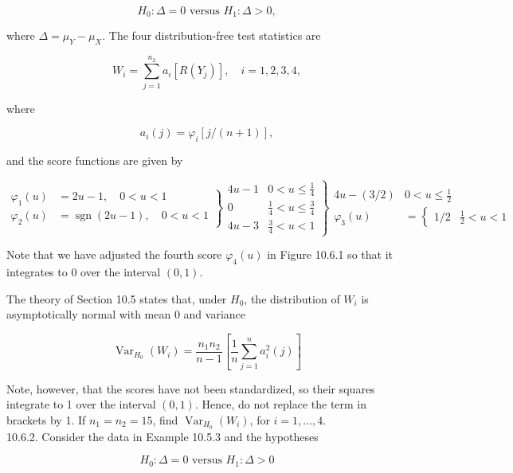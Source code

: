 $$
H_{0}: \Delta=0 \text { versus } H_{1}: \Delta>0,
$$

where $\Delta=\mu_{Y}-\mu_{X}$. The four distribution-free test statistics are


\begin{equation*}
W_{i}=\sum_{j=1}^{n_{2}} a_{i}\left[R\left(Y_{j}\right)\right], \quad i=1,2,3,4, \tag{10.6.4}
\end{equation*}


where

$$
a_{i}(j)=\varphi_{i}[j /(n+1)],
$$

and the score functions are given by

$$
\left.\left.\begin{array}{rl}
\varphi_{1}(u) & =2 u-1, \quad 0<u<1 \\
\varphi_{2}(u) & =\operatorname{sgn}(2 u-1), \quad 0<u<1
\end{array}\right\} \begin{array}{ll}
4 u-1 & 0<u \leq \frac{1}{4} \\
0 & \frac{1}{4}<u \leq \frac{3}{4} \\
4 u-3 & \frac{3}{4}<u<1
\end{array}\right\} \begin{array}{ll}
4 u-(3 / 2) & 0<u \leq \frac{1}{2} \\
\varphi_{3}(u) & = \begin{cases}1 / 2 & \frac{1}{2}<u<1\end{cases}
\end{array}
$$

Note that we have adjusted the fourth score $\varphi_{4}(u)$ in Figure 10.6.1 so that it integrates to 0 over the interval $(0,1)$.

The theory of Section 10.5 states that, under $H_{0}$, the distribution of $W_{i}$ is asymptotically normal with mean 0 and variance

$$
\operatorname{Var}_{H_{0}}\left(W_{i}\right)=\frac{n_{1} n_{2}}{n-1}\left[\frac{1}{n} \sum_{j=1}^{n} a_{i}^{2}(j)\right]
$$

Note, however, that the scores have not been standardized, so their squares integrate to 1 over the interval $(0,1)$. Hence, do not replace the term in brackets by 1. If $n_{1}=n_{2}=15$, find $\operatorname{Var}_{H_{0}}\left(W_{i}\right)$, for $i=1, \ldots, 4$.\\
10.6.2. Consider the data in Example 10.5.3 and the hypotheses

$$
H_{0}: \Delta=0 \text { versus } H_{1}: \Delta>0
$$

